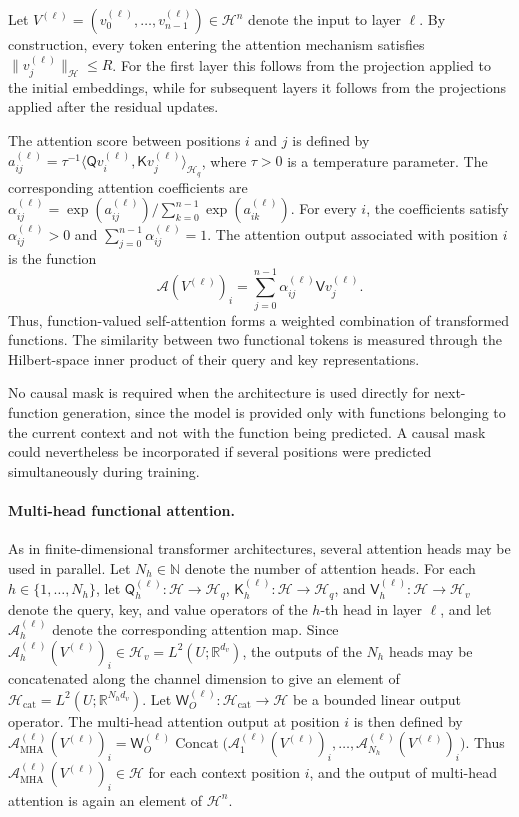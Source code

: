 Let \(V^{(\ell)}=(v_0^{(\ell)},\ldots,v_{n-1}^{(\ell)})\in\mathcal H^n\) denote the input to layer \(\ell\). By construction, every token entering the attention mechanism satisfies \(\|v_j^{(\ell)}\|_{\mathcal H}\leqslant R\). For the first layer this follows from the projection applied to the initial embeddings, while for subsequent layers it follows from the projections applied after the residual updates.

The attention score between positions \(i\) and \(j\) is defined by \(a_{ij}^{(\ell)}=\tau^{-1}\langle \mathsf Qv_i^{(\ell)},\mathsf Kv_j^{(\ell)}\rangle_{\mathcal H_q}\), where \(\tau>0\) is a temperature parameter.
The corresponding attention coefficients are \(\alpha_{ij}^{(\ell)}=\exp(a_{ij}^{(\ell)})/\sum_{k=0}^{n-1}\exp(a_{ik}^{(\ell)})\). For every \(i\), the coefficients satisfy \(\alpha_{ij}^{(\ell)}>0\) and \(\sum_{j=0}^{n-1}\alpha_{ij}^{(\ell)}=1\).
The attention output associated with position \(i\) is the function
\[\mathcal A(V^{(\ell)})_i=\sum_{j=0}^{n-1}\alpha_{ij}^{(\ell)}\mathsf Vv_j^{(\ell)}.\]
Thus, function-valued self-attention forms a weighted combination of transformed functions. The similarity between two functional tokens is measured through the Hilbert-space inner product of their query and key representations.

No causal mask is required when the architecture is used directly for next-function generation, since the model is provided only with functions belonging to the current context and not with the function being predicted. A causal mask could nevertheless be incorporated if several positions were predicted simultaneously during training.

\paragraph{Multi-head functional attention.}

As in finite-dimensional transformer architectures, several attention heads may be used in parallel. Let \(N_h\in\mathbb N\) denote the number of attention heads. For each \(h\in\{1,\ldots,N_h\}\), let \(\mathsf Q_h^{(\ell)}:\mathcal H\to\mathcal H_q\), \(\mathsf K_h^{(\ell)}:\mathcal H\to\mathcal H_q\), and \(\mathsf V_h^{(\ell)}:\mathcal H\to\mathcal H_v\) denote the query, key, and value operators of the \(h\)-th head in layer \(\ell\), and let \(\mathcal A_h^{(\ell)}\) denote the corresponding attention map. Since \(\mathcal A_h^{(\ell)}(V^{(\ell)})_i\in\mathcal H_v=L^2(U;\mathbb R^{d_v})\), the outputs of the \(N_h\) heads may be concatenated along the channel dimension to give an element of \(\mathcal H_{\mathrm{cat}}=L^2(U;\mathbb R^{N_h d_v})\). Let \(\mathsf W_O^{(\ell)}:\mathcal H_{\mathrm{cat}}\to\mathcal H\) be a bounded linear output operator. The multi-head attention output at position \(i\) is then defined by \(\mathcal A_{\mathrm{MHA}}^{(\ell)}(V^{(\ell)})_i=\mathsf W_O^{(\ell)}\operatorname{Concat}\bigl(\mathcal A_1^{(\ell)}(V^{(\ell)})_i,\ldots,\mathcal A_{N_h}^{(\ell)}(V^{(\ell)})_i\bigr)\). Thus \(\mathcal A_{\mathrm{MHA}}^{(\ell)}(V^{(\ell)})_i\in\mathcal H\) for each context position \(i\), and the output of multi-head attention is again an element of \(\mathcal H^n\).

